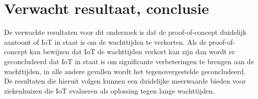 \section{Verwacht resultaat, conclusie}%
\label{sec:verwachte_resultaten}




De verwachte resultaten voor dit onderzoek is dat de proof-of-concept duidelijk aantoont of IoT in staat is om de wachttijden te verkorten. Als de proof-of-concept kan bewijzen dat IoT de wachttijden verkort kan zijn dan wordt er geconcludeerd dat IoT in staat is om significante verbeteringen te brengen aan de wachttijden, in alle andere gevallen wordt het tegenovergestelde geconcludeerd. De resultaten die hieruit volgen kunnen een duidelijke meerwaarde bieden voor ziekenhuizen die IoT evalueren als oplossing tegen lange wachttijden.

